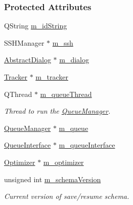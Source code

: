 \subsubsection*{Protected Attributes}
\begin{DoxyCompactItemize}
\item 
Q\+String \hyperlink{classGlobalSearch_1_1OptBase_af9223062bbb616246d5bf60ad29e1c7d}{m\+\_\+id\+String}
\item 
S\+S\+H\+Manager $\ast$ \hyperlink{classGlobalSearch_1_1OptBase_a723a6dd0bb93aff451007ccb079e2f65}{m\+\_\+ssh}
\item 
\hyperlink{classGlobalSearch_1_1AbstractDialog}{Abstract\+Dialog} $\ast$ \hyperlink{classGlobalSearch_1_1OptBase_a4673e81b57e648320474bf3024906161}{m\+\_\+dialog}
\item 
\hyperlink{classGlobalSearch_1_1Tracker}{Tracker} $\ast$ \hyperlink{classGlobalSearch_1_1OptBase_a60a2c6053a8ae3716854c68d0837b921}{m\+\_\+tracker}
\item 
\hypertarget{classGlobalSearch_1_1OptBase_a80b28eb1b9d8d7a055ddabb55c753f20}{}Q\+Thread $\ast$ \hyperlink{classGlobalSearch_1_1OptBase_a80b28eb1b9d8d7a055ddabb55c753f20}{m\+\_\+queue\+Thread}\label{classGlobalSearch_1_1OptBase_a80b28eb1b9d8d7a055ddabb55c753f20}

\begin{DoxyCompactList}\small\item\em Thread to run the \hyperlink{classGlobalSearch_1_1QueueManager}{Queue\+Manager}. \end{DoxyCompactList}\item 
\hyperlink{classGlobalSearch_1_1QueueManager}{Queue\+Manager} $\ast$ \hyperlink{classGlobalSearch_1_1OptBase_a187a29ceafe0c4a45ecb7a925267f93a}{m\+\_\+queue}
\item 
\hyperlink{classGlobalSearch_1_1QueueInterface}{Queue\+Interface} $\ast$ \hyperlink{classGlobalSearch_1_1OptBase_a8f5f83dae1456bbff32ea9b3b6731ba0}{m\+\_\+queue\+Interface}
\item 
\hyperlink{classGlobalSearch_1_1Optimizer}{Optimizer} $\ast$ \hyperlink{classGlobalSearch_1_1OptBase_a9bc76450b0d52ab9fc9a4caaf97143b7}{m\+\_\+optimizer}
\item 
\hypertarget{classGlobalSearch_1_1OptBase_a7e2fe2db52705fd57edf9178e03345bd}{}unsigned int \hyperlink{classGlobalSearch_1_1OptBase_a7e2fe2db52705fd57edf9178e03345bd}{m\+\_\+schema\+Version}\label{classGlobalSearch_1_1OptBase_a7e2fe2db52705fd57edf9178e03345bd}

\begin{DoxyCompactList}\small\item\em Current version of save/resume schema. \end{DoxyCompactList}\end{DoxyCompactItemize}


